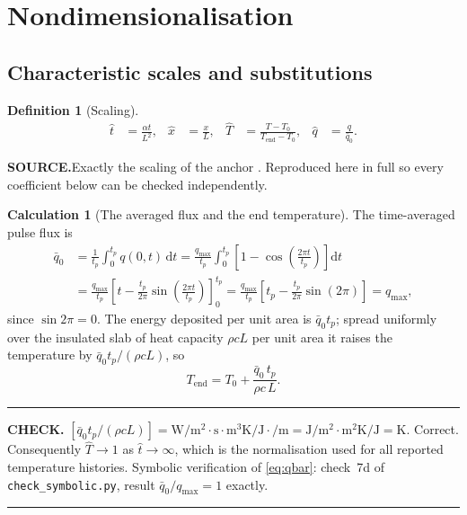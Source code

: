 \documentclass[11pt,a4paper]{article}
\theoremstyle{definition}
\newtheorem{definitionx}{Definition}[section]
\newtheorem{calculationx}{Calculation}[section]
\newenvironment{checkbox}%
  {\par\medskip\noindent\begin{minipage}{\linewidth}%
   \rule{\linewidth}{0.4pt}\par\noindent\textbf{CHECK.}\enspace}%
  {\par\rule{\linewidth}{0.4pt}\end{minipage}\par\medskip}
\newcommand{\source}[1]{\par\smallskip\noindent\textbf{SOURCE.}\enspace #1\par}
\begin{document}
\section{Nondimensionalisation}
\label{sec:nondim}

\subsection{Characteristic scales and substitutions}

\begin{definitionx}[Scaling]
\label{def:scaling}
\begin{align}
  \hat t &= \frac{\alpha t}{L^{2}}, &
  \hat x &= \frac{x}{L}, &
  \hat T &= \frac{T-T_{0}}{T_{\mathrm{end}}-T_{0}}, &
  \hat q &= \frac{q}{\bar q_{0}} .
  \label{eq:scaling}
\end{align}
\end{definitionx}

\source{Exactly the scaling of the anchor \cite{Kovacs2018}. Reproduced here in
full so every coefficient below can be checked independently.}

\begin{calculationx}[The averaged flux and the end temperature]
\label{calc:qbar}
The time-averaged pulse flux is
\begin{align}
  \bar q_{0}
   &= \frac{1}{t_{p}}\int_{0}^{t_{p}} q(0,t)\,\mathrm{d}t
    = \frac{q_{\max}}{t_{p}}\int_{0}^{t_{p}}
      \left[1-\cos\!\left(\frac{2\pi t}{t_{p}}\right)\right]\mathrm{d}t
      \nonumber\\
   &= \frac{q_{\max}}{t_{p}}
      \left[t - \frac{t_{p}}{2\pi}\sin\!\left(\frac{2\pi t}{t_{p}}\right)
      \right]_{0}^{t_{p}}
    = \frac{q_{\max}}{t_{p}}
      \left[t_{p} - \frac{t_{p}}{2\pi}\sin(2\pi)\right]
    = q_{\max} ,
  \label{eq:qbar}
\end{align}
since $\sin 2\pi = 0$. The energy deposited per unit area is
$\bar q_{0}t_{p}$; spread uniformly over the insulated slab of heat capacity
$\rho c L$ per unit area it raises the temperature by
$\bar q_{0}t_{p}/(\rho c L)$, so
\begin{equation}
  T_{\mathrm{end}} = T_{0} + \frac{\bar q_{0}\,t_{p}}{\rho c\,L} .
  \label{eq:Tend}
\end{equation}
\end{calculationx}

\begin{checkbox}
$[\bar q_{0}t_{p}/(\rho c L)]
 = \si{\watt\per\metre\squared}\cdot\si{\second}\cdot
   \si{\metre\cubed\kelvin\per\joule}\cdot\si{\per\metre}
 = \si{\joule\per\metre\squared}\cdot\si{\metre\squared\kelvin\per\joule}
 = \si{\kelvin}$. Correct. Consequently $\hat T\to1$ as $\hat t\to\infty$,
which is the normalisation used for all reported temperature histories.
Symbolic verification of \eqref{eq:qbar}: check~7d of
\texttt{check\_symbolic.py}, result $\bar q_{0}/q_{\max}=1$ exactly.
\end{checkbox}
\end{document}
